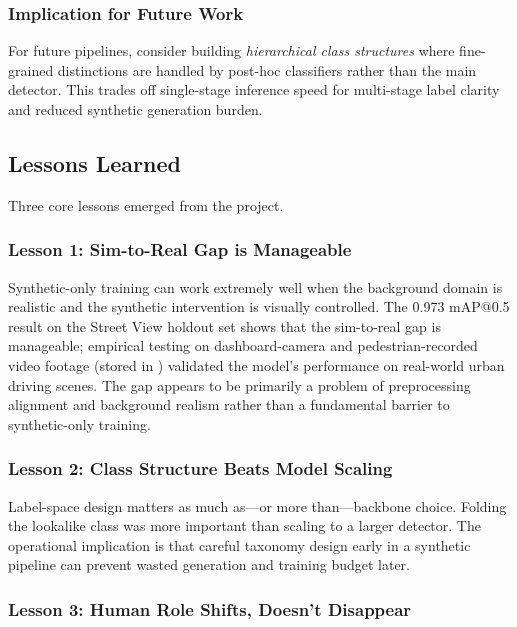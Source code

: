 \documentclass[12pt,a4paper]{article}
\newcommand{\fpath}[1]{\texttt{\detokenize{#1}}}
\begin{document}
\subsubsection{Implication for Future Work}

For future pipelines, consider building \emph{hierarchical class structures} where fine-grained distinctions are handled by post-hoc classifiers rather than the main detector. This trades off single-stage inference speed for multi-stage label clarity and reduced synthetic generation burden.

\subsection{Lessons Learned}

Three core lessons emerged from the project.

\subsubsection{Lesson 1: Sim-to-Real Gap is Manageable}

Synthetic-only training can work extremely well when the background domain is realistic and the synthetic intervention is visually controlled. The 0.973 mAP@0.5 result on the Street View holdout set shows that the sim-to-real gap is manageable; empirical testing on dashboard-camera and pedestrian-recorded video footage (stored in \fpath{test-videos/}) validated the model's performance on real-world urban driving scenes. The gap appears to be primarily a problem of preprocessing alignment and background realism rather than a fundamental barrier to synthetic-only training.

\subsubsection{Lesson 2: Class Structure Beats Model Scaling}

Label-space design matters as much as---or more than---backbone choice. Folding the lookalike class was more important than scaling to a larger detector. The operational implication is that careful taxonomy design early in a synthetic pipeline can prevent wasted generation and training budget later.

\subsubsection{Lesson 3: Human Role Shifts, Doesn't Disappear}
\end{document}
